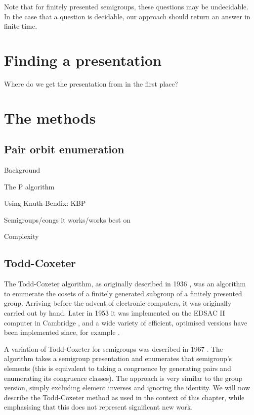 Note that for finitely presented semigroups, these questions may be
undecidable.  In the case that a question is decidable, our approach should
return an answer in finite time.

\section{Finding a presentation}

Where do we get the presentation from in the first place?

\section{The methods}

\subsection{Pair orbit enumeration}
\label{sec:p}

Background

The P algorithm

Using Knuth-Bendix: KBP

Semigroups/congs it works/works best on

Complexity

\subsection{Todd-Coxeter}
\label{sec:tc}

The Todd-Coxeter algorithm, as originally described in 1936
\cite{todd_coxeter_1936}, was an algorithm to enumerate the cosets of a finitely
generated subgroup of a finitely presented group.  Arriving before the advent of
electronic computers, it was originally carried out by hand.  Later in 1953 it
was implemented on the EDSAC II computer in Cambridge \cite{leech_1963}, and a
wide variety of efficient, optimised versions have been implemented since, for
example \cite{ace}.

A variation of Todd-Coxeter for semigroups was described in 1967
\cite{neumann_1967}.  The algorithm takes a semigroup presentation and
enumerates that semigroup's elements (this is equivalent to taking a congruence
by generating pairs and enumerating its congruence classes).  The approach is
very similar to the group version, simply excluding element inverses and
ignoring the identity.  We will now describe the Todd-Coxeter method as used in
the context of this chapter, while emphasising that this does not represent
significant new work.

